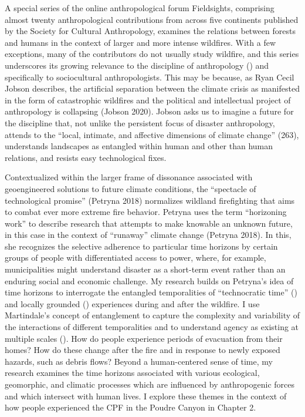 \documentclass[
]{article}
\begin{document}
A special series of the online anthropological forum Fieldsights, comprising almost twenty anthropological contributions from across five continents published by the Society for Cultural Anthropology, examines the relations between forests and humans in the context of larger and more intense wildfires. With a few exceptions, many of the contributors do not usually study wildfire, and this series underscores its growing relevance to the discipline of anthropology () and specifically to sociocultural anthropologists. This may be because, as Ryan Cecil Jobson describes, the artificial separation between the climate crisis as manifested in the form of catastrophic wildfires and the political and intellectual project of anthropology is collapsing (Jobson 2020). Jobson asks us to imagine a future for the discipline that, not unlike the persistent focus of disaster anthropology, attends to the ``local, intimate, and affective dimensions of climate change'' (263), understands landscapes as entangled within human and other than human relations, and resists easy technological fixes.

Contextualized within the larger frame of dissonance associated with geoengineered solutions to future climate conditions, the ``spectacle of technological promise'' (Petryna 2018) normalizes wildland firefighting that aims to combat ever more extreme fire behavior. Petryna uses the term ``horizoning work'' to describe research that attempts to make knowable an unknown future, in this case in the context of ``runaway'' climate change (Petryna 2018). In this, she recognizes the selective adherence to particular time horizons by certain groups of people with differentiated access to power, where, for example, municipalities might understand disaster as a short-term event rather than an enduring social and economic challenge. My research builds on Petryna's idea of time horizons to interrogate the entangled temporalities of ``technocratic time'' () and locally grounded () experiences during and after the wildfire. I use Martindale's concept of entanglement to capture the complexity and variability of the interactions of different temporalities and to understand agency as existing at multiple scales (). How do people experience periods of evacuation from their homes? How do these change after the fire and in response to newly exposed hazards, such as debris flows? Beyond a human-centered sense of time, my research examines the time horizons associated with various ecological, geomorphic, and climatic processes which are influenced by anthropogenic forces and which intersect with human lives. I explore these themes in the context of how people experienced the CPF in the Poudre Canyon in Chapter 2.
\end{document}
